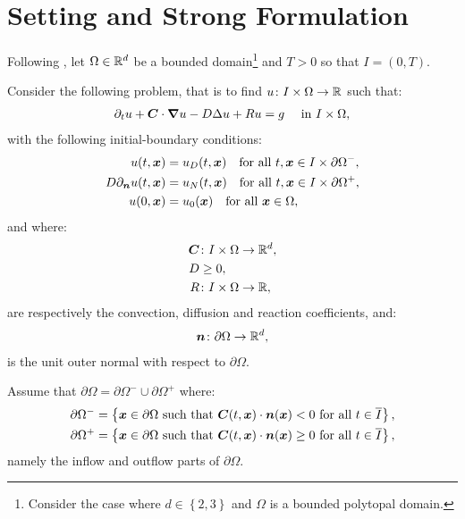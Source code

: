 \section{Setting and Strong Formulation}

Following \cite{Feistauer2007}, let $\Omega \in \mathbb{R}^{d}$ be a bounded domain\footnote{Consider the case where $d \in \left\{ 2, 3 \right\}$ and $\Omega$ is a bounded polytopal domain.} and $T > 0$ so that $I = \left( 0, T\right)$.

Consider the following problem, that is to find $u \colon I \times \Omega \rightarrow \mathbb{R}$ such that:
\begin{gather}
    \partial_t u + \bm{C} \cdot \bm{\nabla} u - D \Delta u + R u = g \quad \text{ in } I \times \Omega, \label{equation:cdr}
\end{gather}
with the following initial-boundary conditions:
\begin{align}
    u(t, \bm{x}) &= u_D(t, \bm{x}) \quad \text{for all } t, \bm{x} \in I \times \partial \Omega^-, \label{equation:cdr_dirichlet} \\
    D \partial_{\bm{n}} u(t, \bm{x}) &= u_N(t, \bm{x}) \quad \text{for all } t, \bm{x} \in I \times \partial \Omega^+, \label{equation:cdr_neumann} \\
    u(0, \bm{x}) &= u_0(\bm{x}) \quad \text{for all } \bm{x} \in \Omega, \label{equation:cdr_initial}
\end{align}
and where:
\begin{align}
    \bm{C} & \colon I \times \Omega \rightarrow \mathbb{R}^{d}, \\
    D & \geq 0, \\
    R & \colon I \times \Omega \rightarrow \mathbb{R},
\end{align}
are respectively the convection, diffusion and reaction coefficients, and:
\begin{gather}
    \bm{n} \colon \partial \Omega \rightarrow \mathbb{R}^{d},
\end{gather}
is the unit outer normal with respect to $\partial \Omega$.

Assume that $\partial \Omega = \partial \Omega^- \cup \partial \Omega^+$ where:
\begin{align}
    \partial \Omega^- = \left\{ \bm{x} \in \partial \Omega \text{ such that } \bm{C}(t, \bm{x}) \cdot \bm{n}(\bm{x}) < 0 \text{ for all } t \in \overline{I} \right\}, \\
    \partial \Omega^+ = \left\{ \bm{x} \in \partial \Omega \text{ such that } \bm{C}(t, \bm{x}) \cdot \bm{n}(\bm{x}) \geq 0 \text{ for all } t \in \overline{I} \right\},
\end{align}
namely the inflow and outflow parts of $\partial \Omega$.


